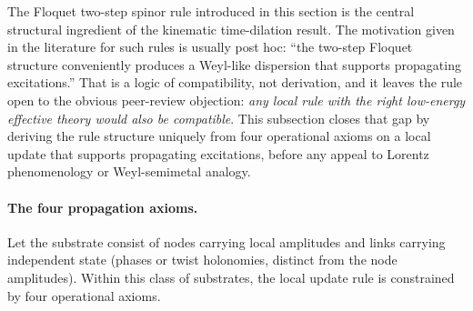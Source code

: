 \documentclass[11pt,a4paper]{article}
\begin{document}
The Floquet two-step spinor rule introduced in this section is
the central structural ingredient of the kinematic time-dilation
result. The motivation given in the literature for such rules is
usually post hoc: ``the two-step Floquet structure conveniently
produces a Weyl-like dispersion that supports propagating
excitations.'' That is a logic of compatibility, not derivation,
and it leaves the rule open to the obvious peer-review objection:
\emph{any local rule with the right low-energy effective theory
would also be compatible}. This subsection closes that gap by
deriving the rule structure uniquely from four operational
axioms on a local update that supports propagating excitations,
before any appeal to Lorentz phenomenology or Weyl-semimetal
analogy.

\paragraph{The four propagation axioms.}
Let the substrate consist of nodes carrying local amplitudes
and links carrying independent state (phases or twist
holonomies, distinct from the node amplitudes). Within this
class of substrates, the local update rule is constrained by
four operational axioms.
\end{document}

